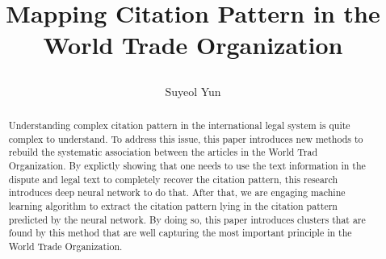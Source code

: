 \documentclass[12pt,letterpaper]{article}
\newcommand{\tit}{\bf 

Mapping Citation Pattern in the World Trade Organization
}
\newcommand\spacingset[1]{\renewcommand{\baselinestretch}
{#1}\small\normalsize}
\begin{document}
\spacingset{1.25}

\setcounter{page}{0}
\vspace{-.1in}

{\title{
\tit
}
\author{Suyeol Yun
}
\maketitle
}

\thispagestyle{empty}
\vspace{-.1in}

\begin{abstract}

Understanding complex citation pattern in the international legal system is quite complex to understand.
To address this issue, this paper introduces new methods to rebuild the systematic association between the articles in the World Trad Organization. By explictly showing that one needs to use the text information in the dispute and legal text to completely recover the citation pattern, this research introduces deep neural network to do that. After that, we are engaging machine learning algorithm to extract the citation pattern lying in the citation pattern predicted by the neural network. By doing so, this paper introduces clusters that are found by this method that are well capturing the most important principle in the World Trade Organization.

\end{abstract}

\spacingset{1.5}


\end{document}

